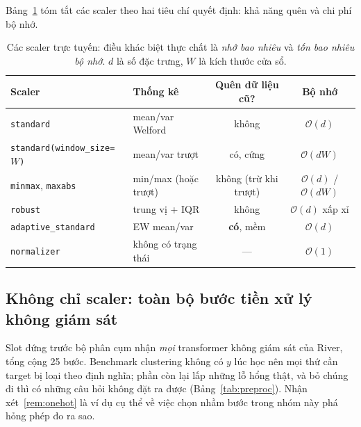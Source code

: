 \documentclass[11pt,a4paper]{article}
\theoremstyle{remark}
\begin{document}
Bảng~\ref{tab:scalers} tóm tắt các scaler theo hai tiêu chí quyết định: khả năng
quên và chi phí bộ nhớ.

\begin{table}[htbp]
\centering
\small
\caption{Các scaler trực tuyến: điều khác biệt thực chất là \emph{nhớ bao nhiêu}
và \emph{tốn bao nhiêu bộ nhớ}. $d$ là số đặc trưng, $W$ là kích thước cửa sổ.}
\label{tab:scalers}
\begin{tabular}{@{}llcc@{}}
\toprule
\textbf{Scaler} & \textbf{Thống kê} & \textbf{Quên dữ liệu cũ?} & \textbf{Bộ nhớ} \\
\midrule
\texttt{standard} & mean/var Welford & không & $\mathcal{O}(d)$ \\
\texttt{standard(window\_size=$W$)} & mean/var trượt & có, cứng & $\mathcal{O}(dW)$ \\
\texttt{minmax}, \texttt{maxabs} & min/max (hoặc trượt) & không (trừ khi trượt) & $\mathcal{O}(d)$ / $\mathcal{O}(dW)$ \\
\texttt{robust} & trung vị + IQR & không & $\mathcal{O}(d)$ xấp xỉ \\
\texttt{adaptive\_standard} & EW mean/var & \textbf{có}, mềm & $\mathcal{O}(d)$ \\
\texttt{normalizer} & không có trạng thái & --- & $\mathcal{O}(1)$ \\
\bottomrule
\end{tabular}
\end{table}

\subsection{Không chỉ scaler: toàn bộ bước tiền xử lý không giám sát}
\label{sec:preproc-all}

Slot đứng trước bộ phân cụm nhận \emph{mọi} transformer không giám sát của River,
tổng cộng 25 bước. Benchmark clustering không có $y$ lúc học nên mọi thứ cần
target bị loại theo định nghĩa; phần còn lại lấp những lỗ hổng thật, và bỏ chúng
đi thì có những câu hỏi không đặt ra được (Bảng~\ref{tab:preproc}). Nhận
xét~\ref{rem:onehot} là ví dụ cụ thể về việc chọn nhầm bước trong nhóm này phá
hỏng phép đo ra sao.
\end{document}
